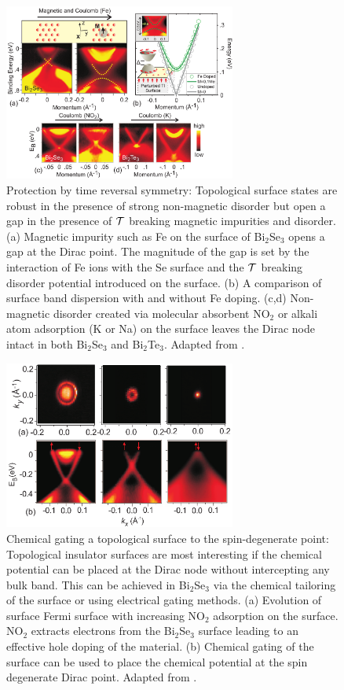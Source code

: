 \documentclass[twocolumn,floatfix,showpacs,rmp,aps]{revtex4}
\begin{document}
	\begin{figure}
		\includegraphics[width=3in]{Fig15}%
		\caption{ Protection by time reversal
			symmetry: Topological surface states are robust in the presence of
			strong non-magnetic disorder but open a gap in the presence of
			${\cal T}$ breaking magnetic impurities and disorder. (a) Magnetic
			impurity such as Fe on the surface of Bi$_2$Se$_3$ opens a gap at the
			Dirac point. The magnitude of the gap is set by the interaction of Fe
			ions with the Se surface and the ${\cal T}$ breaking disorder
			potential introduced on the surface. (b) A comparison of surface band
			dispersion with and without Fe doping. (c,d) Non-magnetic disorder
			created via molecular absorbent NO$_2$ or alkali atom adsorption (K
			or Na) on the surface leaves the Dirac node intact in both
			Bi$_2$Se$_3$ and Bi$_2$Te$_3$.  Adapted from .}
		\label{fig:zfig5}
	\end{figure}
	
	\begin{figure}
		\includegraphics[width=3in]{Fig16}%
		\caption{
			Chemical gating a topological
			surface to the spin-degenerate point: Topological insulator surfaces
			are most interesting if the chemical potential can be placed at the
			Dirac node without intercepting any bulk band. This can be
			achieved in Bi$_2$Se$_3$ via the chemical tailoring of the surface or
			using electrical gating methods. (a) Evolution of surface Fermi
			surface with increasing NO$_2$ adsorption on the surface.
			NO$_2$ extracts electrons from the Bi$_2$Se$_3$ surface leading to an
			effective hole doping of the material. (b) Chemical gating of the
			surface can be used to place the chemical potential at the spin
			degenerate Dirac point.  Adapted from .}
		\label{fig:zfig6}
	\end{figure}
	
\end{document}
